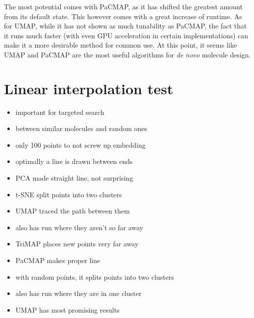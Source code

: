 The most potential comes with PaCMAP, as it has shifted the greatest amount from its default state. This however comes with a great increase of runtime. As for UMAP, while it has not shown as much tunability as PaCMAP, the fact that it runs much faster (with even GPU acceleration in certain implementations) can make it a more desirable method for common use. At this point, it seems like UMAP and PaCMAP are the most useful algorithms for \textit{de novo} molecule design.

\section{Linear interpolation test}\label{sec:linear-interpolation-test}

\begin{itemize}
	\item important for targeted search
	\item between similar molecules and random ones
	\item only 100 points to not screw up embedding
	\item optimally a line is drawn  between ends
	\item PCA made straight line, not surprising
	\item t-SNE split points into two clusters
	\item UMAP traced the path between them
	\item also has run where they aren't so far away
	\item TriMAP places new points very far away
	\item PaCMAP makes proper line
	\item with random points, it splits points into two clusters
	\item also has run where they are in one cluster
	\item UMAP has most promising results
\end{itemize}

